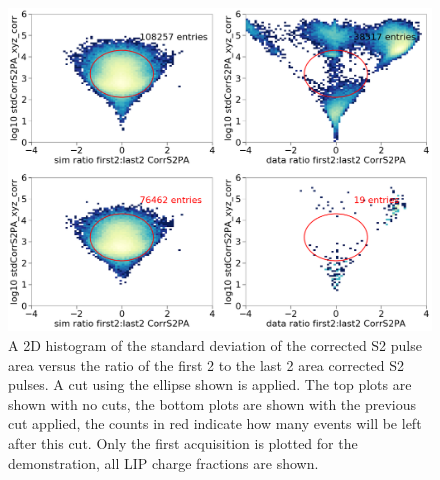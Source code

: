 \begin{figure}[htbp]
\begin{center}
\includegraphics[width=\textwidth]{figures/lips/cut4.png}
\caption{ A 2D histogram of the standard deviation of the corrected S2 pulse area versus the ratio of the first 2 to the last 2 area corrected S2 pulses. A cut using the ellipse shown is applied. The top plots are shown with no cuts, the bottom plots are shown with the previous cut applied, the counts in red indicate how many events will be left after this cut. Only the first acquisition is plotted for the demonstration, all \acs{LIP} charge fractions are shown. }
\label{fig:cut4}
\end{center}
\end{figure}


